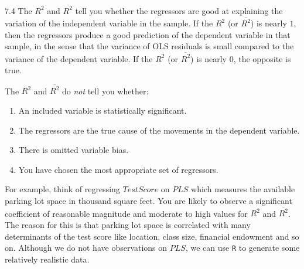 \documentclass[]{book}
\newenvironment{Shaded}{\begin{snugshade}}{\end{snugshade}}
\newcommand{\KeywordTok}[1]{\textcolor[rgb]{0.13,0.29,0.53}{\textbf{#1}}}
\newcommand{\DataTypeTok}[1]{\textcolor[rgb]{0.13,0.29,0.53}{#1}}
\newcommand{\DecValTok}[1]{\textcolor[rgb]{0.00,0.00,0.81}{#1}}
\newcommand{\FloatTok}[1]{\textcolor[rgb]{0.00,0.00,0.81}{#1}}
\newcommand{\StringTok}[1]{\textcolor[rgb]{0.31,0.60,0.02}{#1}}
\newcommand{\CommentTok}[1]{\textcolor[rgb]{0.56,0.35,0.01}{\textit{#1}}}
\newcommand{\OperatorTok}[1]{\textcolor[rgb]{0.81,0.36,0.00}{\textbf{#1}}}
\newcommand{\NormalTok}[1]{#1}
\theoremstyle{definition}
\theoremstyle{definition}
\theoremstyle{definition}
\theoremstyle{remark}
\begin{document}
\begin{keyconcepts}{7.4}
The $R^2$ and $\overline{R^2}$ tell you whether the regressors are good at explaining the variation of the independent variable in the sample. If the $R^2$ (or $\overline{R^2}$) is nearly $1$, then the regressors produce a good prediction of the dependent variable in that sample, in the sense that the variance of OLS residuals is small compared to the variance of the dependent variable. If the $R^2$ (or $\overline{R^2}$) is nearly $0$, the opposite is true.\newline

The $R^2$ and $\overline{R^2}$ do \textit{not} tell you whether:\newline

\begin{enumerate}
\item An included variable is statistically significant. 
\item The regressors are the true cause of the movements in the dependent variable.
\item There is omitted variable bias.
\item You have chosen the most appropriate set of regressors.
\end{enumerate}
\end{keyconcepts}

For example, think of regressing \(TestScore\) on \(PLS\) which measures
the available parking lot space in thousand square feet. You are likely
to observe a significant coefficient of reasonable magnitude and
moderate to high values for \(R^2\) and \(\overline{R^2}\). The reason
for this is that parking lot space is correlated with many determinants
of the test score like location, class size, financial endowment and so
on. Although we do not have observations on \(PLS\), we can use
\texttt{R} to generate some relatively realistic data.

\begin{Shaded}
\end{Shaded}
\end{document}
